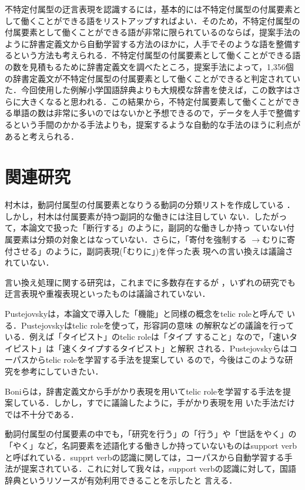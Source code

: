 \documentclass{nlp}
\begin{document}
不特定付属型の迂言表現を認識するには，基本的には不特定付属型の付属要素と
して働くことができる語をリストアップすればよい．そのため，不特定付属型の
付属要素として働くことができる語が非常に限られているのならば，提案手法の
ように辞書定義文から自動学習する方法のほかに，人手でそのような語を整備す
るという方法も考えられる．不特定付属型の付属要素として働くことができる語
の数を見積もるために辞書定義文を調べたところ，提案手法によって，1,356個
の辞書定義文が不特定付属型の付属要素として働くことができると判定されてい
た．今回使用した例解小学国語辞典よりも大規模な辞書を使えば，この数字はさ
らに大きくなると思われる．この結果から，不特定付属要素して働くことができ
る単語の数は非常に多いのではないかと予想できるので，データを人手で整備す
るという手間のかかる手法よりも，提案するような自動的な手法のほうに利点が
あると考えられる．


\section{関連研究}
村木は，動詞付属型の付属要素となりうる動詞の分類リストを作成している
\cite{Muraki91}．しかし，村木は付属要素が持つ副詞的な働きには注目してい
ない．したがって，本論文で扱った「断行する」のように，副詞的な働きしか持っ
ていない付属要素は分類の対象とはなっていない．さらに，「寄付を強制する
$\rightarrow$むりに寄付させる」のように，副詞表現(「むりに」)を伴った表
現への言い換えは議論されていない．

言い換え処理に関する研究は，これまでに多数存在するが
\cite{Barzilay01,Lin01,Shinyama02,Torisawa02,Barzilay03,Duclaye03,Bo03}
，いずれの研究でも迂言表現や重複表現といったものは議論されていない．

Pustejovskyは，本論文で導入した「機能」と同様の概念をtelic roleと呼んで
いる\cite{Pustejovsky91}．Pustejovskyはtelic roleを使って，形容詞の意味
の解釈などの議論を行っている．例えば「タイピスト」のtelic roleは「タイプ
すること」なので，「速いタイピスト」は「速くタイプするタイピスト」と解釈
される．Pustejovskyらはコーパスからtelic roleを学習する手法を提案してい
るので，今後はこのような研究を参考にしていきたい．

Boniらは，辞書定義文から手がかり表現を用いてtelic roleを学習する手法を提
案している\cite{Boni02}．しかし，すでに議論したように，手がかり表現を用
いた手法だけでは不十分である．

動詞付属型の付属要素の中でも，「研究を行う」の「行う」や「世話をやく」の
「やく」など，名詞要素を述語化する働きしか持っていないものはsupport verb
と呼ばれている．supprt verbの認識に関しては，コーパスから自動学習する手
法が提案されている\cite{Grefenstette95}．これに対して我々は，support
verbの認識に対して，国語辞典というリソースが有効利用できることを示したと
言える．
\end{document}

